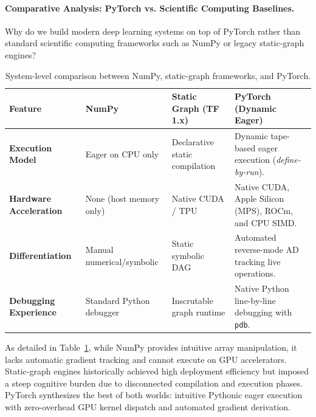 \documentclass[11pt,a4paper]{article}
\begin{document}
\paragraph{Comparative Analysis: PyTorch vs. Scientific Computing Baselines.}
Why do we build modern deep learning systems on top of PyTorch rather than standard scientific computing frameworks such as NumPy or legacy static-graph engines?

\begin{table}[htbp]
\centering
\small
\renewcommand{\arraystretch}{1.2}
\begin{tabularx}{\textwidth}{l p{3.2cm} p{3.2cm} X}
\toprule
\textbf{Feature} & \textbf{NumPy} & \textbf{Static Graph (TF 1.x)} & \textbf{PyTorch (Dynamic Eager)} \\
\midrule
\textbf{Execution Model} & Eager on CPU only & Declarative static compilation & Dynamic tape-based eager execution (\textit{define-by-run}). \\
\textbf{Hardware Acceleration} & None (host memory only) & Native CUDA / TPU & Native CUDA, Apple Silicon (MPS), ROCm, and CPU SIMD. \\
\textbf{Differentiation} & Manual numerical/symbolic & Static symbolic DAG & Automated reverse-mode AD tracking live operations. \\
\textbf{Debugging Experience} & Standard Python debugger & Inscrutable graph runtime & Native Python line-by-line debugging with \texttt{pdb}. \\
\bottomrule
\end{tabularx}
\caption{System-level comparison between NumPy, static-graph frameworks, and PyTorch.}
\label{tab:framework_comparison}
\end{table}

As detailed in Table~\ref{tab:framework_comparison}, while NumPy provides intuitive array manipulation, it lacks automatic gradient tracking and cannot execute on GPU accelerators. Static-graph engines historically achieved high deployment efficiency but imposed a steep cognitive burden due to disconnected compilation and execution phases. PyTorch synthesizes the best of both worlds: intuitive Pythonic eager execution with zero-overhead GPU kernel dispatch and automated gradient derivation.

\clearpage

\end{document}
